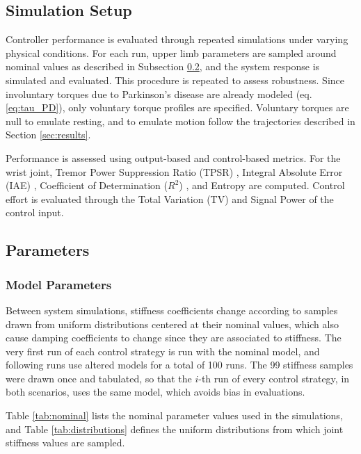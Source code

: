     
\subsection{Simulation Setup}

Controller performance is evaluated through repeated simulations under varying physical conditions. 
For each run, upper limb parameters are sampled around nominal values as described in Subsection \ref{sec:parameters}, 
and the system response is simulated and evaluated. 
This procedure is repeated to assess robustness. 
Since involuntary torques due to Parkinson's disease are already modeled
(eq. \eqref{eq:tau_PD}), 
only voluntary torque profiles are specified. 
Voluntary torques are null to emulate resting, 
and to emulate motion follow the trajectories described in Section \ref{sec:results}.

Performance is assessed using output-based and control-based metrics. 
For the wrist joint, Tremor Power Suppression Ratio (TPSR) \citep{Qi:2024}, 
Integral Absolute Error (IAE) \citep{Skogestad:2003}, 
Coefficient of Determination ($R^2$) \citep{Glantz:1990}, and 
Entropy \citep{Lathi:2018} are computed. 
Control effort is evaluated through the 
Total Variation (TV) \citep{Skogestad:2003} and 
Signal Power \citep{Lathi:2018} of the control input.

\subsection{Parameters}
\label{sec:parameters}

\subsubsection{Model Parameters}
Between system simulations, stiffness coefficients change according to samples drawn from uniform distributions centered at their nominal values, which also cause damping coefficients to change since they are associated to stiffness.
The very first run of each control strategy is run with the nominal model, and following runs use altered models for a total of 100 runs. 
The 99 stiffness samples were drawn once and tabulated, so that the $i$-th run of every control strategy, in both scenarios, uses the same model, which avoids bias in evaluations.

Table \ref{tab:nominal} lists the nominal parameter values used in the simulations, and Table \ref{tab:distributions} defines the uniform distributions from which joint stiffness values are sampled. 
%
\begin{table}[htbp]
    \centering
    \caption{Nominal values of simulation parameters. Based on \cite{Gebai:2018}.}
    \label{tab:nominal}
    
\end{table}
%
\begin{table}[htbp]
    \centering
    \caption{Sampling intervals of joints stiffness.}
    \label{tab:distributions}
    
\end{table}

